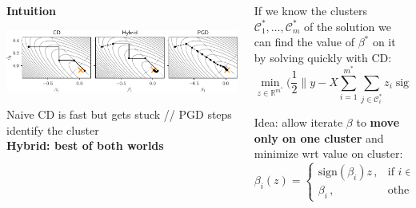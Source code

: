 \documentclass[english,final,t]{beamer}
\newcommand{\bbR}{\mathbb{R}}
\newcommand{\cC}{\mathcal{C}}
\DeclareMathOperator{\sign}{sign}
\begin{document}
\begin{frame}{}
\begin{columns}[t]
\begin{column}{.3\linewidth}
	\begin{block}{\textbf{\color{malgared} Intuition}}

		\begin{center}
			\includegraphics[width=0.8\linewidth]{images/illustration_solvers}

			Naive CD is fast but gets stuck // PGD steps identify the cluster \\[5mm]

			\textbf{\textcolor{malgared}{Hybrid: best of both worlds}}
		\end{center}

	\end{block}
\end{column}
\begin{column}{.32\linewidth}
	\begin{block}{\textbf{\color{malgared}{\#1 Clusterwise minimization}}}
		If we know the clusters $\cC_1^*, \ldots, \cC_m^*$ of the solution we can find the value of $\beta^*$ on it by solving quickly with CD:
		\begin{equation*}
			\min_{z \in \bbR^{m^*}}\bigg(
				\frac{1}{2} \Big\lVert y - X \sum_{i=1}^{m^*} \sum_{j \in \mathcal{C}_i^*} z_i \sign(\beta_j^*) e_j \Big\rVert^2
				+ \sum_{i=1}^{m^*} | z_i | \sum_{j \in \mathcal{C}_i^*} \lambda_j
				\bigg).
		\end{equation*}

		Idea: allow iterate $\beta$ to \textbf{move only on one cluster} and minimize wrt value on cluster:
		\begin{equation*}
			\beta_i(z) =
			\begin{cases}
			  \text{sign}(\beta_i) z   \, , & \text{if } i \in \mathcal{C}_k \, , \\
			  \beta_i \, ,                    & \text{otherwise} \, .
			\end{cases}
		\end{equation*}


\end{block}
\end{column}
\end{columns}
\end{frame}
\end{document}

